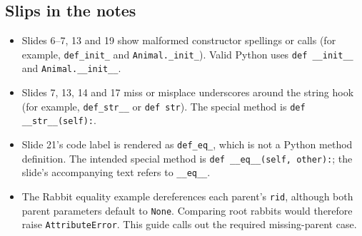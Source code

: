 \documentclass[11pt]{article}
\begin{document}
\begin{keepsection}
\section{Slips in the notes}

\begin{itemize}
\item Slides 6–7, 13 and 19 show malformed constructor spellings or calls (for example, \texttt{def\_init\_} and \texttt{Animal.\_init\_}). Valid Python uses \texttt{def \_\_init\_\_} and \texttt{Animal.\_\_init\_\_}.
\item Slides 7, 13, 14 and 17 miss or misplace underscores around the string hook (for example, \texttt{def\_str\_\_} or \texttt{def str}). The special method is \texttt{def \_\_str\_\_(self):}.
\item Slide 21’s code label is rendered as \texttt{def\_eq\_}, which is not a Python method definition. The intended special method is \texttt{def \_\_eq\_\_(self, other):}; the slide’s accompanying text refers to \texttt{\_\_eq\_\_}.
\item The Rabbit equality example dereferences each parent’s \texttt{rid}, although both parent parameters default to \texttt{None}. Comparing root rabbits would therefore raise \texttt{AttributeError}. This guide calls out the required missing-parent case.
\end{itemize}
\end{keepsection}
\end{document}
